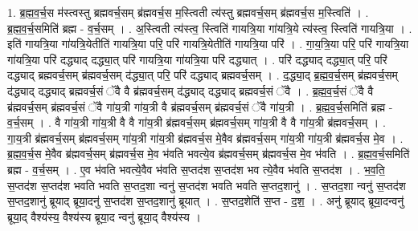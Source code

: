 \documentclass[17pt]{extarticle}
\begin{document}
1. ब्र॒ह्म॒व॒र्च॒स म॑स्त्वस्तु ब्रह्मवर्च॒सम् ब्र॑ह्मवर्च॒स म॒स्त्विती त्य॑स्तु ब्रह्मवर्च॒सम् ब्र॑ह्मवर्च॒स म॒स्त्विति॑ । . ब्र॒ह्म॒व॒र्च॒समिति॑ ब्रह्म - व॒र्च॒सम् । . अ॒स्त्विती त्य॑स्त्व॒ स्त्विति॑ गायत्रि॒या गा॑यत्रि॒ये त्य॑स्त्व॒ स्त्विति॑ गायत्रि॒या । . इति॑ गायत्रि॒या गा॑यत्रि॒येतीति॑ गायत्रि॒या परि॒ परि॑ गायत्रि॒येतीति॑ गायत्रि॒या परि॑ । . गा॒य॒त्रि॒या परि॒ परि॑ गायत्रि॒या गा॑यत्रि॒या परि॑ दद्ध्याद् दद्ध्या॒त् परि॑ गायत्रि॒या गा॑यत्रि॒या परि॑ दद्ध्यात् । . परि॑ दद्ध्याद् दद्ध्या॒त् परि॒ परि॑ दद्ध्याद् ब्रह्मवर्च॒सम् ब्र॑ह्मवर्च॒सम् द॑द्ध्या॒त् परि॒ परि॑ दद्ध्याद् ब्रह्मवर्च॒सम् । . द॒द्ध्या॒द् ब्र॒ह्म॒व॒र्च॒सम् ब्र॑ह्मवर्च॒सम् द॑द्ध्याद् दद्ध्याद् ब्रह्मवर्च॒सं ॅवै वै ब्र॑ह्मवर्च॒सम् द॑द्ध्याद् दद्ध्याद् ब्रह्मवर्च॒सं ॅवै । . ब्र॒ह्म॒व॒र्च॒सं ॅवै वै ब्र॑ह्मवर्च॒सम् ब्र॑ह्मवर्च॒सं ॅवै गा॑य॒त्री गा॑य॒त्री वै ब्र॑ह्मवर्च॒सम् ब्र॑ह्मवर्च॒सं ॅवै गा॑य॒त्री । . ब्र॒ह्म॒व॒र्च॒समिति॑ ब्रह्म - व॒र्च॒सम् । . वै गा॑य॒त्री गा॑य॒त्री वै वै गा॑य॒त्री ब्र॑ह्मवर्च॒सम् ब्र॑ह्मवर्च॒सम् गा॑य॒त्री वै वै गा॑य॒त्री ब्र॑ह्मवर्च॒सम् । . गा॒य॒त्री ब्र॑ह्मवर्च॒सम् ब्र॑ह्मवर्च॒सम् गा॑य॒त्री गा॑य॒त्री ब्र॑ह्मवर्च॒स मे॒वैव ब्र॑ह्मवर्च॒सम् गा॑य॒त्री गा॑य॒त्री ब्र॑ह्मवर्च॒स मे॒व । . ब्र॒ह्म॒व॒र्च॒स मे॒वैव ब्र॑ह्मवर्च॒सम् ब्र॑ह्मवर्च॒स मे॒व भ॑वति भवत्ये॒व ब्र॑ह्मवर्च॒सम् ब्र॑ह्मवर्च॒स मे॒व भ॑वति । . ब्र॒ह्म॒व॒र्च॒समिति॑ ब्रह्म - व॒र्च॒सम् । . ए॒व भ॑वति भवत्ये॒वैव भ॑वति स॒प्तद॑श स॒प्तद॑श भव त्ये॒वैव भ॑वति स॒प्तद॑श । . भ॒व॒ति॒ स॒प्तद॑श स॒प्तद॑श भवति भवति स॒प्तद॒शा न्वनु॑ स॒प्तद॑श भवति भवति स॒प्तद॒शानु॑ । . स॒प्तद॒शा न्वनु॑ स॒प्तद॑श स॒प्तद॒शानु॑ ब्रूयाद् ब्रूया॒दनु॑ स॒प्तद॑श स॒प्तद॒शानु॑ ब्रूयात् । . स॒प्तद॒शेति॑ स॒प्त - द॒श॒ । . अनु॑ ब्रूयाद् ब्रूया॒दन्वनु॑ ब्रूया॒द् वैश्य॑स्य॒ वैश्य॑स्य ब्रूया॒द न्वनु॑ ब्रूया॒द् वैश्य॑स्य । \newline
\end{document}
